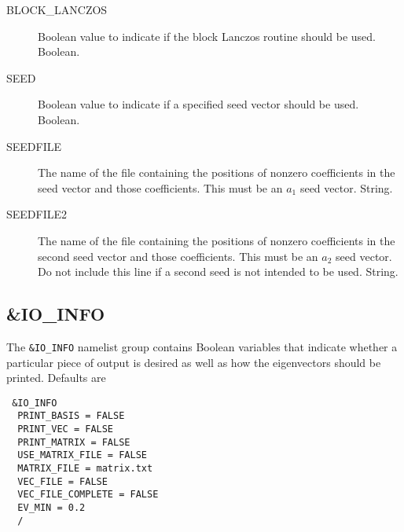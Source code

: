 \documentclass{article}
\begin{document}
\begin{description}
\item[BLOCK\_LANCZOS] Boolean value to indicate if the block Lanczos
  routine should be used. Boolean.
  
\item[SEED] Boolean value to indicate if a specified seed vector should be used. Boolean.

\item[SEEDFILE] The name of the file containing the positions of nonzero coefficients in the seed vector and those coefficients. This must be an $a_1$ seed vector. String.

\item[SEEDFILE2] The name of the file containing the positions of nonzero coefficients in the second seed vector and those coefficients. This must be an $a_2$ seed vector. Do not include this line if a second seed is not intended to be used. String.

\end{description}

\subsection{\&IO\_INFO}

The {\tt \&IO\_INFO} namelist group contains Boolean variables that
indicate whether a particular piece of output is desired as well
as how the eigenvectors should be printed. Defaults are

\begin{verbatim}
 &IO_INFO
  PRINT_BASIS = FALSE
  PRINT_VEC = FALSE
  PRINT_MATRIX = FALSE
  USE_MATRIX_FILE = FALSE
  MATRIX_FILE = matrix.txt
  VEC_FILE = FALSE
  VEC_FILE_COMPLETE = FALSE
  EV_MIN = 0.2
  /
\end{verbatim}
\end{document}
